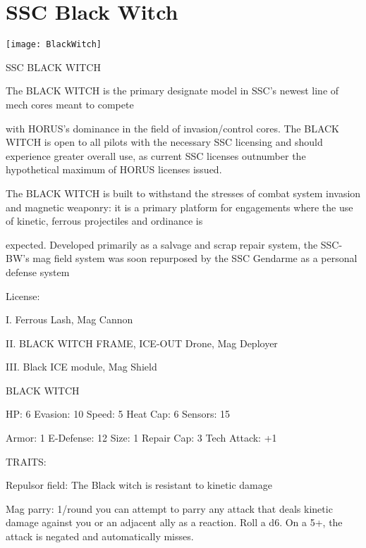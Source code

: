 \section{SSC Black Witch}

\begin{center}
    \texttt{[image: BlackWitch]}
\end{center}


                                            SSC BLACK WITCH

The BLACK WITCH is the primary designate model in SSC’s newest line of mech cores meant to compete

with HORUS’s dominance in the field of invasion/control cores. The BLACK WITCH is open to all pilots with
the necessary SSC licensing and should experience greater overall use, as current SSC licenses outnumber
the hypothetical maximum of HORUS licenses issued.

The BLACK WITCH is built to withstand the stresses of combat system invasion and magnetic weaponry: it
is a primary platform for engagements where the use of kinetic, ferrous projectiles and ordinance is

expected. Developed primarily as a salvage and scrap repair system, the SSC-BW’s mag field system was
soon repurposed by the SSC Gendarme as a personal defense system




                                                  License:

I. Ferrous Lash, Mag Cannon

II. BLACK WITCH FRAME, ICE-OUT Drone, Mag Deployer

III. Black ICE module, Mag Shield


                                             BLACK WITCH

 HP: 6          Evasion: 10                          Speed: 5           Heat Cap: 6        Sensors: 15

 Armor: 1       E-Defense: 12                        Size: 1            Repair Cap: 3      Tech Attack:
                                                                                           +1

                                                  TRAITS:

 Repulsor field: The Black witch is resistant to kinetic damage

 Mag parry: 1/round you can attempt to parry any attack that deals kinetic damage against you or an
 adjacent ally as a reaction. Roll a d6. On a 5+, the attack is negated and automatically misses.

